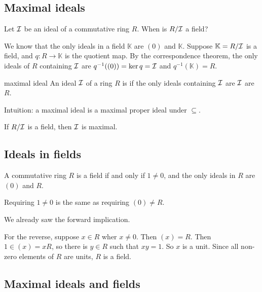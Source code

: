 \documentclass[12pt,letterpaper]{report}
\begin{document}
\subsection{Maximal ideals}

Let $\mathcal{I}$ be an ideal of a commutative ring $R$.
When is $R/\mathcal{I}$ a field?

We know that the only ideals in a field $\mathbb{K}$ are $(0)$ and $\mathbb{K}$.
Suppose $\mathbb{K} = R/\mathcal{I}$ is a field, and $q \colon R \to \mathbb{K}$ is the quotient map.
By the correspondence theorem, the only ideals of $R$ containing $\mathcal{I}$ are
$q^{-1}((0)) = \ker q = \mathcal{I}$ and $q^{-1}(\mathbb{K}) = R$.

\begin{defn}{maximal ideal}{}
  An ideal $\mathcal{I}$ of a ring $R$ is  if the only ideals containing $\mathcal{I}$ are
  $\mathcal{I}$ are $R$.
\end{defn}

Intuition: a maximal ideal is a maximal proper ideal under $\subseteq$.

\begin{lem}{}{}
  If $R/\mathcal{I}$ is a field, then $\mathcal{I}$ is maximal.
\end{lem}

\pagebreak
\subsection{Ideals in fields}

\begin{prop}{}{}
  A commutative ring $R$ is a field if and only if $1 \neq 0$, and the only ideals in $R$ are $(0)$
  and $R$.
\end{prop}

Requiring $1 \neq 0$ is the same as requiring $(0) \neq R$.

\begin{thmproof}
  We already saw the forward implication.

  For the reverse, suppose $x \in R$ wher $x \neq 0$.
  Then $(x) = R$.
  Then $1 \in (x) = xR$, so there is $y \in R$ such that $xy = 1$.
  So $x$ is a unit.
  Since all non-zero elements of $R$ are units, $R$ is a field.
\end{thmproof}

\pagebreak
\subsection{Maximal ideals and fields}
\end{document}
